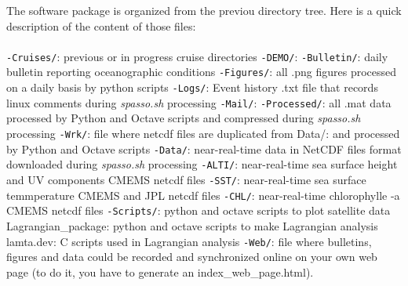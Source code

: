 \documentclass[12pt,a4paper]{article}
\begin{document}

The software package is organized from the previou directory tree. Here is a quick description of the content of those files: \\
\\
\noindent \texttt{-Cruises/}: previous or in progress cruise directories \newline
\indent \texttt{-DEMO/}: \newline
\indent \indent \texttt{-Bulletin/}: daily bulletin reporting oceanographic conditions \newline
\indent \indent \texttt{-Figures/}: all .png figures processed on a daily basis by python scripts \newline
\indent \indent \texttt{-Logs/}: Event history .txt file that records linux comments during \textit{spasso.sh} processing \newline
\indent \indent \texttt{-Mail/}:  \newline
\indent \indent \texttt{-Processed/}: all .mat data processed by Python and Octave scripts and compressed during \textit{spasso.sh} processing \newline
\indent \indent \texttt{-Wrk/}: file where netcdf files are duplicated from Data/: and processed by Python and Octave scripts \newline
\noindent \texttt{-Data/}: near-real-time data in NetCDF files format downloaded during \textit{spasso.sh} processing \newline
\indent \texttt{-ALTI/}: near-real-time sea surface height and UV components CMEMS netcdf files \newline 
\indent \texttt{-SST/}:  near-real-time sea surface temmperature CMEMS and JPL netcdf files \newline
\indent \texttt{-CHL/}: near-real-time chlorophylle -a CMEMS netcdf files \newline
\texttt{-Scripts/}: python and octave scripts to plot satellite data \newline
\indent Lagrangian\_package: python and octave scripts to make Lagrangian analysis \newline
\indent \indent lamta.dev: C scripts used in Lagrangian analysis \newline
\noindent \texttt{-Web/}: file where bulletins, figures and data could be recorded and synchronized online on your own web page (to do it, you have to generate an index\_web\_page.html).\newline
\end{document}
